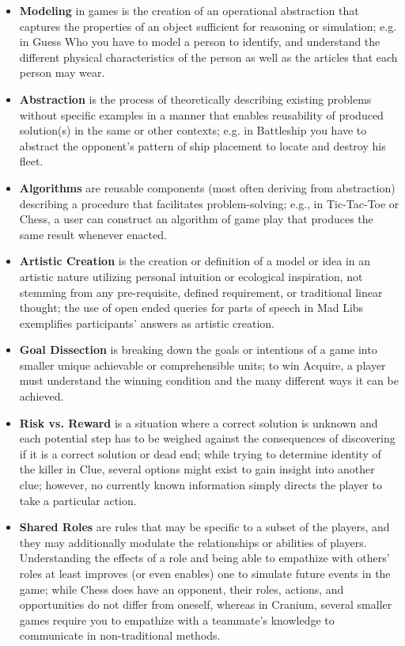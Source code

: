 \documentclass{acm_proc_article-sp}
\begin{document}
\begin{itemize}
  \item{\textbf{Modeling} in games is the creation of an operational abstraction that captures the properties of an object sufficient for reasoning or simulation; e.g. in Guess Who you have to model a person to identify, and understand the different physical characteristics of the person as well as the articles that each person may wear.}
  \item{\textbf{Abstraction} is the process of theoretically describing existing problems without specific examples in a manner that enables reusability of produced solution(s) in the same or other contexts; e.g. in Battleship you have to abstract the opponent's pattern of ship placement to locate and destroy his fleet.}
  \item{\textbf{Algorithms} are reusable components (most often deriving from abstraction) describing a procedure that facilitates problem-solving; e.g., in Tic-Tac-Toe or Chess, a user can construct an algorithm of game play that produces the same result whenever enacted.}
  \item{\textbf{Artistic Creation} is the creation or definition of a model or idea in an artistic nature utilizing personal intuition or ecological inspiration, not stemming from any pre-requisite, defined requirement, or traditional linear thought; the use of open ended queries for parts of speech in Mad Libs exemplifies participants' answers as artistic creation.}
  \item{\textbf{Goal Dissection} is breaking down the goals or intentions of a game into smaller unique achievable or comprehensible units; to win Acquire, a player must understand the winning condition and the many different ways it can be achieved.}
  \item{\textbf{Risk vs. Reward} is a situation where a correct solution is unknown and each potential step has to be weighed against the consequences of discovering if it is a correct solution or dead end; while trying to determine identity of the killer in Clue, several options might exist to gain insight into another clue; however, no currently known information simply directs the player to take a particular action.}
  \item{\textbf{Shared Roles} are rules that may be specific to a subset of the players, and they may additionally modulate the relationships or abilities of players.
  Understanding the effects of a role and being able to empathize with others' roles at least improves (or even enables) one to simulate future events in the game; while Chess does have an opponent, their roles, actions, and opportunities do not differ from oneself, whereas in Cranium, several smaller games require you to empathize with a teammate's knowledge to communicate in non-traditional methods.}

\end{itemize}
\end{document}
